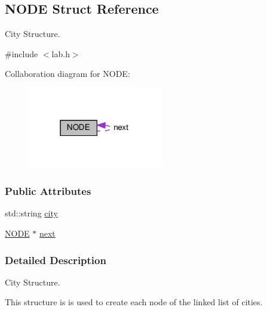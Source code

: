 \hypertarget{structNODE}{\subsection{N\+O\+D\+E Struct Reference}
\label{structNODE}
}


City Structure.  




{\ttfamily \#include $<$lab.\+h$>$}



Collaboration diagram for N\+O\+D\+E\+:\nopagebreak
\begin{figure}[H]
\begin{center}
\leavevmode
\includegraphics[width=166pt]{structNODE__coll__graph}
\end{center}
\end{figure}
\subsubsection*{Public Attributes}
\begin{DoxyCompactItemize}
\item 
std\+::string \hyperlink{structNODE_a76c9a9603778b363e65bfe84da4bd72e}{city}
\item 
\hyperlink{structNODE}{N\+O\+D\+E} $\ast$ \hyperlink{structNODE_a078472e8ab2d2fe38e052f5c2a425618}{next}
\end{DoxyCompactItemize}


\subsubsection{Detailed Description}
City Structure. 

This structure is is used to create each node of the linked list of cities. 

